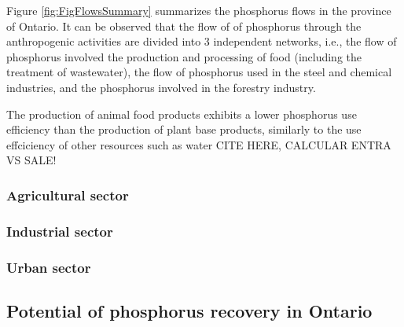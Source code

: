 \documentclass[authoryear]{elsarticle}
\begin{document}
Figure \ref{fig:FigFlowsSummary} summarizes the phosphorus flows in the province of Ontario. It can be observed that the flow of of phosphorus through the anthropogenic activities are divided into 3 independent networks, i.e., the flow of phosphorus involved the production and processing of food (including the treatment of wastewater), the flow of phosphorus used in the steel and chemical industries, and the phosphorus involved in the forestry industry.

The production of animal food products exhibits a lower phosphorus use efficiency than the production of plant base products, similarly to the use effciciency of other resources such as water CITE HERE, CALCULAR ENTRA VS SALE!

\subsubsection{Agricultural sector}

\subsubsection{Industrial sector}

\subsubsection{Urban sector}

\subsection{Potential of phosphorus recovery in Ontario}
%
\end{document}
